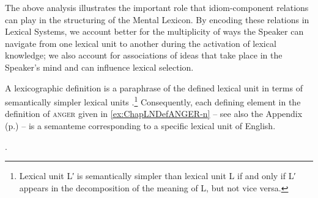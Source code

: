 The above analysis illustrates the important role that idiom-component relations can play in the structuring of the Mental Lexicon. By encoding these relations in Lexical Systems, we account better for the multiplicity of ways the Speaker can navigate from one lexical unit to another during the activation of lexical knowledge; we also account for associations of ideas that take place in the Speaker's mind and can influence lexical selection.

\label{sec:meaningInclusionRelation}

A lexicographic definition is a paraphrase of the defined lexical unit in terms of semantically simpler lexical units \parencite{MelcukPolguere2018}.\footnote{Lexical unit L′ is semantically simpler than lexical unit L if and only if L′ appears in the decomposition of the meaning of L, but not vice versa.} Consequently, each defining element in the definition of \textsc{anger} given in \ref{ex:ChapLNDefANGER-n} -- see also the Appendix (p.\thinspace\pageref{def:ANGER-n}) -- is a semanteme corresponding to a specific lexical unit of English.

\begingroup
\small

\ex. \label{ex:ChapLNDefANGER-n}

